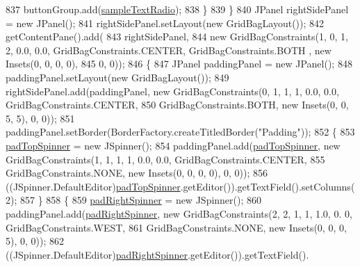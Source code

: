 \begin{DoxyCode}
837                 buttonGroup.add(\mbox{\hyperlink{classorg_1_1newdawn_1_1slick_1_1tools_1_1hiero_1_1_hiero_ab6178cf8bcd6425842e1b3fd20465e9e}{sampleTextRadio}});
838             \}
839         \}
840         JPanel rightSidePanel = \textcolor{keyword}{new} JPanel();
841         rightSidePanel.setLayout(\textcolor{keyword}{new} GridBagLayout());
842         getContentPane().add(
843             rightSidePanel,
844             \textcolor{keyword}{new} GridBagConstraints(1, 0, 1, 2, 0.0, 0.0, GridBagConstraints.CENTER, GridBagConstraints.BOTH
      , \textcolor{keyword}{new} Insets(0, 0, 0, 0),
845                 0, 0));
846         \{
847             JPanel paddingPanel = \textcolor{keyword}{new} JPanel();
848             paddingPanel.setLayout(\textcolor{keyword}{new} GridBagLayout());
849             rightSidePanel.add(paddingPanel, \textcolor{keyword}{new} GridBagConstraints(0, 1, 1, 1, 0.0, 0.0, 
      GridBagConstraints.CENTER,
850                 GridBagConstraints.BOTH, \textcolor{keyword}{new} Insets(0, 0, 5, 5), 0, 0));
851             paddingPanel.setBorder(BorderFactory.createTitledBorder(\textcolor{stringliteral}{"Padding"}));
852             \{
853                 \mbox{\hyperlink{classorg_1_1newdawn_1_1slick_1_1tools_1_1hiero_1_1_hiero_a10d07901d4b2d2729d228eb329ff873a}{padTopSpinner}} = \textcolor{keyword}{new} JSpinner();
854                 paddingPanel.add(\mbox{\hyperlink{classorg_1_1newdawn_1_1slick_1_1tools_1_1hiero_1_1_hiero_a10d07901d4b2d2729d228eb329ff873a}{padTopSpinner}}, \textcolor{keyword}{new} GridBagConstraints(1, 1, 1, 1, 0.0, 0.0, 
      GridBagConstraints.CENTER,
855                     GridBagConstraints.NONE, \textcolor{keyword}{new} Insets(0, 0, 0, 0), 0, 0));
856                 ((JSpinner.DefaultEditor)\mbox{\hyperlink{classorg_1_1newdawn_1_1slick_1_1tools_1_1hiero_1_1_hiero_a10d07901d4b2d2729d228eb329ff873a}{padTopSpinner}}.getEditor()).getTextField().setColumns(
      2);
857             \}
858             \{
859                 \mbox{\hyperlink{classorg_1_1newdawn_1_1slick_1_1tools_1_1hiero_1_1_hiero_a2c0741d232f9cd9054bdb82cc9d0c8b3}{padRightSpinner}} = \textcolor{keyword}{new} JSpinner();
860                 paddingPanel.add(\mbox{\hyperlink{classorg_1_1newdawn_1_1slick_1_1tools_1_1hiero_1_1_hiero_a2c0741d232f9cd9054bdb82cc9d0c8b3}{padRightSpinner}}, \textcolor{keyword}{new} GridBagConstraints(2, 2, 1, 1, 1.0, 0.
      0, GridBagConstraints.WEST,
861                     GridBagConstraints.NONE, \textcolor{keyword}{new} Insets(0, 0, 0, 5), 0, 0));
862                 ((JSpinner.DefaultEditor)\mbox{\hyperlink{classorg_1_1newdawn_1_1slick_1_1tools_1_1hiero_1_1_hiero_a2c0741d232f9cd9054bdb82cc9d0c8b3}{padRightSpinner}}.getEditor()).getTextField().

\end{DoxyCode}
